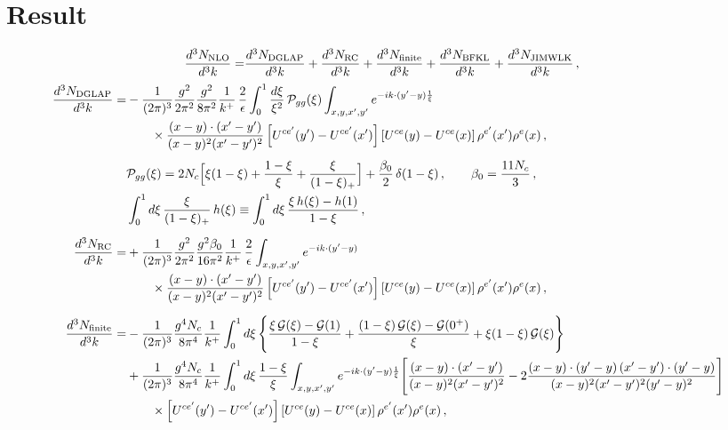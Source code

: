 \documentclass[10pt]{article}
\begin{document}
\section*{Result}
\begin{align}
\frac{d^{3}N_{\rm NLO}}{d^{3}k}=&\frac{d^{3}N_{\rm DGLAP}}{d^{3}k}+\frac{d^{3}N_{\rm RC}}{d^{3}k}+\frac{d^{3}N_{\rm finite}}{d^{3}k}+\frac{d^{3}N_{\rm BFKL}}{d^{3}k}+\frac{d^{3}N_{\rm JIMWLK}}{d^{3}k}\,,
\end{align}
\begin{align}
\frac{d^{3}N_{\rm DGLAP}}{d^{3}k}=&-\frac{1}{(2\pi)^{3}}\frac{g^{2}}{2\pi^{2}}\frac{g^{2}}{8\pi^{2}}\frac{1}{k^{+}}\,\frac{2}{\epsilon}\int_{0}^{1}\frac{d\xi}{\xi^{2}}\,\mathcal P_{gg}(\xi)\int_{x,y,x',y'}e^{-ik\cdot(y'-y)\frac{1}{\xi}}\notag\\
&\qquad\times\frac{(x-y)\cdot(x'-y')}{(x-y)^{2}(x'-y')^{2}}\left[U^{ce'}(y')-U^{ce'}(x')\right]\left[U^{ce}(y)-U^{ce}(x)\right]\rho^{e'}(x')\rho^{e}(x)\,,\\[4pt]
&\mathcal P_{gg}(\xi)=2N_{c}\Big[\xi(1-\xi)+\frac{1-\xi}{\xi}+\frac{\xi}{(1-\xi)_{+}}\Big]+\frac{\beta_{0}}{2}\,\delta(1-\xi)\,,\qquad\beta_{0}=\frac{11N_{c}}{3}\,,\notag\\
&\int_0^1 d\xi\,\frac{\xi}{(1-\xi)_+}\,h(\xi)\equiv\int_0^1 d\xi\,\frac{\xi\,h(\xi)-h(1)}{1-\xi}\,,\notag\\[6pt]
\frac{d^{3}N_{\rm RC}}{d^{3}k}=&+\frac{1}{(2\pi)^{3}}\frac{g^{2}}{2\pi^{2}}\frac{g^{2}\beta_{0}}{16\pi^{2}}\frac{1}{k^{+}}\,\frac{2}{\epsilon}\int_{x,y,x',y'}e^{-ik\cdot(y'-y)}\notag\\
&\qquad\times\frac{(x-y)\cdot(x'-y')}{(x-y)^{2}(x'-y')^{2}}\left[U^{ce'}(y')-U^{ce'}(x')\right]\left[U^{ce}(y)-U^{ce}(x)\right]\rho^{e'}(x')\rho^{e}(x)\,,\\[6pt]
\frac{d^{3}N_{\rm finite}}{d^{3}k}=&-\frac{1}{(2\pi)^{3}}\frac{g^{4}N_{c}}{8\pi^{4}}\frac{1}{k^{+}}\int_{0}^{1}d\xi\,\Bigg\{\frac{\xi\,\mathcal G(\xi)-\mathcal G(1)}{1-\xi}+\frac{(1-\xi)\,\mathcal G(\xi)-\mathcal G(0^+)}{\xi}+\xi(1-\xi)\,\mathcal G(\xi)\Bigg\}\notag\\
&+\frac{1}{(2\pi)^{3}}\frac{g^{4}N_{c}}{8\pi^{4}}\frac{1}{k^{+}}\int_{0}^{1}d\xi\,\frac{1-\xi}{\xi}\int_{x,y,x',y'}e^{-ik\cdot(y'-y)\frac{1}{\xi}}\Bigg[\frac{(x-y)\cdot(x'-y')}{(x-y)^{2}(x'-y')^{2}}-2\frac{(x-y)\cdot(y'-y)\,(x'-y')\cdot(y'-y)}{(x-y)^{2}(x'-y')^{2}(y'-y)^{2}}\Bigg]\notag\\
&\qquad\times\left[U^{ce'}(y')-U^{ce'}(x')\right]\left[U^{ce}(y)-U^{ce}(x)\right]\rho^{e'}(x')\rho^{e}(x)\,,
\end{align}
\end{document}
